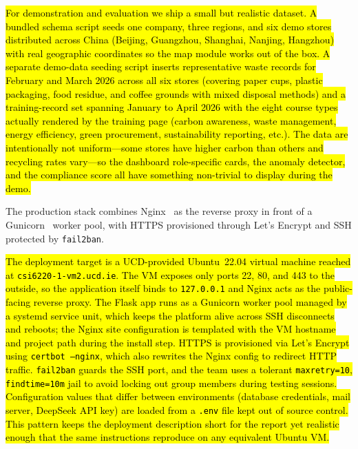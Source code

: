 \documentclass[11pt,a4paper]{article}
\newcommand{\new}[1]{\hl{#1}}
\begin{document}
\new{For demonstration and evaluation we ship a small but realistic dataset. A bundled schema script seeds one company, three regions, and six demo stores distributed across China (Beijing, Guangzhou, Shanghai, Nanjing, Hangzhou) with real geographic coordinates so the map module works out of the box. A separate demo-data seeding script inserts representative waste records for February and March 2026 across all six stores (covering paper cups, plastic packaging, food residue, and coffee grounds with mixed disposal methods) and a training-record set spanning January to April 2026 with the eight course types actually rendered by the training page (carbon awareness, waste management, energy efficiency, green procurement, sustainability reporting, etc.). The data are intentionally not uniform---some stores have higher carbon than others and recycling rates vary---so the dashboard role-specific cards, the anomaly detector, and the compliance score all have something non-trivial to display during the demo.}

The production stack combines Nginx~\cite{nginx} as the reverse proxy in front of a Gunicorn~\cite{gunicorn} worker pool, with HTTPS provisioned through Let's Encrypt and SSH protected by \texttt{fail2ban}.

\new{The deployment target is a UCD-provided Ubuntu~22.04 virtual machine reached at \texttt{csi6220-1-vm2.ucd.ie}. The VM exposes only ports 22, 80, and 443 to the outside, so the application itself binds to \texttt{127.0.0.1} and Nginx acts as the public-facing reverse proxy. The Flask app runs as a Gunicorn worker pool managed by a systemd service unit, which keeps the platform alive across SSH disconnects and reboots; the Nginx site configuration is templated with the VM hostname and project path during the install step. HTTPS is provisioned via Let's Encrypt using \texttt{certbot --nginx}, which also rewrites the Nginx config to redirect HTTP traffic. \texttt{fail2ban} guards the SSH port, and the team uses a tolerant \texttt{maxretry=10}, \texttt{findtime=10m} jail to avoid locking out group members during testing sessions. Configuration values that differ between environments (database credentials, mail server, DeepSeek API key) are loaded from a \texttt{.env} file kept out of source control. This pattern keeps the deployment description short for the report yet realistic enough that the same instructions reproduce on any equivalent Ubuntu VM.}
\end{document}
